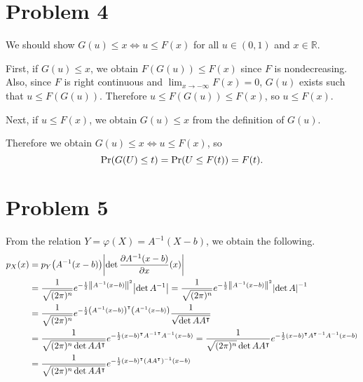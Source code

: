 \documentclass[10pt]{article}
\begin{document}
\section*{Problem 4}
We should show $G(u) \leq x \Leftrightarrow u \leq F(x)$ for all $u \in (0, 1)$ and $x \in \mathbb{R}$.

\vspace{2mm}
First, if $G(u) \leq x$, we obtain $F(G(u)) \leq F(x)$ since $F$ is nondecreasing. 
Also, since $F$ is right continuous and $\lim_{x \to -\infty}F(x) = 0$, $G(u)$ exists such that $u \leq F(G(u))$. 
Therefore $u \leq F(G(u)) \leq F(x)$, so $u \leq F(x)$.

\vspace{2mm}
Next, if $u \leq F(x)$, we obtain $G(u) \leq x$ from the definition of $G(u)$.

\vspace{2mm}
Therefore we obtain $G(u) \leq x \Leftrightarrow u \leq F(x)$, so
$$\mathrm{Pr}\qty(G(U) \leq t) = \mathrm{Pr}\qty(U \leq F(t)) = F(t).$$

\section*{Problem 5}
From the relation $Y = \varphi(X) = A^{-1}(X - b)$, we obtain the following.
\begin{align*}
    p_X(x) &= p_Y\qty(A^{-1}(x - b))\qty|\det\frac{\partial A^{-1}(x - b)}{\partial x}(x)| \\
    &= \frac{1}{\sqrt{(2\pi)^n}}e^{-\frac{1}{2}\left\lVert A^{-1}(x - b) \right\rVert^2}\qty|\det A^{-1}| = \frac{1}{\sqrt{(2\pi)^n}}e^{-\frac{1}{2}\left\lVert A^{-1}(x - b) \right\rVert^2}\qty|\det A|^{-1} \\
    &= \frac{1}{\sqrt{(2\pi)^n}}e^{-\frac{1}{2}\qty(A^{-1}(x - b))^\intercal\qty(A^{-1}(x - b))}\frac{1}{\sqrt{\det AA^\intercal}} \\
    &= \frac{1}{\sqrt{(2\pi)^n\det AA^{\intercal}}}e^{-\frac{1}{2}(x-b)^\intercal {A^{-1}}^\intercal A^{-1}(x-b)} = \frac{1}{\sqrt{(2\pi)^n}\det AA^{\intercal}}e^{-\frac{1}{2}(x-b)^\intercal {A^{\intercal}}^{-1} A^{-1}(x-b)} \\
    &= \frac{1}{\sqrt{(2\pi)^n\det AA^{\intercal}}}e^{-\frac{1}{2}(x-b)^\intercal\qty(AA^\intercal)^{-1}(x-b)}
\end{align*}
\end{document}
